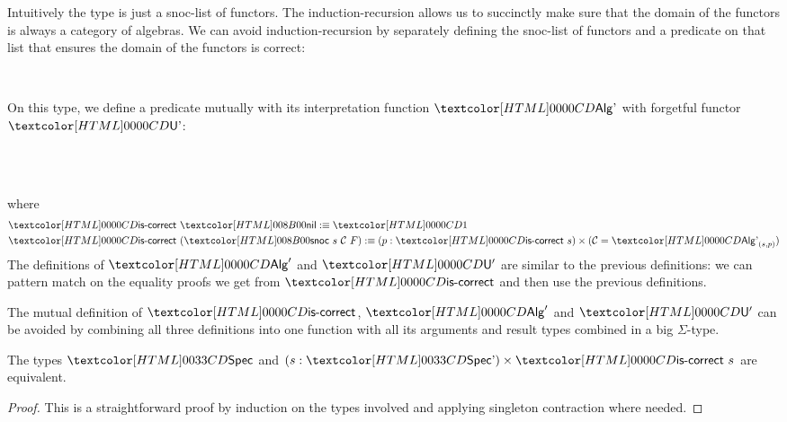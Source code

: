 Intuitively the type is just a snoc-list of functors. The
induction-recursion allows us to succinctly make sure that the domain
of the functors is always a category of algebras. We can avoid
induction-recursion by separately defining the snoc-list of functors
and a predicate on that list that ensures the domain of the functors
is correct:

\begin{definition}
  \begin{datatype}{\specaltty}{\Set}
    \constr{\specaltnil}{\specaltty} \\
    \constr{\specaltsnoc}{\specaltty \to (\Cc : \Cat)\ (\Func{\Cc}{\SET}) \to \specaltty}
  \end{datatype}
  On this type, we define a predicate mutually with its interpretation
  function $\Algalt$ with forgetful functor $\Undalt$:
  \begin{sorts}
    \functy{\specaltiscorrect}{\specaltty \to \Set} \\
     \\
  \end{sorts}
  where
  \begin{align*}
    &\specaltiscorrect\ \specaltnil \ddefeq \unitty \\
    &\specaltiscorrect\ (\specaltsnoc\ s\ \Cc\ F) \ddefeq (p : \specaltiscorrect\ s) \times (\Cc = \Algalt_{(s,p)})
  \end{align*}
  The definitions of $\Alg'$ and $\Und'$ are similar to the previous
  definitions: we can pattern match on the equality proofs we get from
  $\specaltiscorrect$ and then use the previous definitions.
\end{definition}

\begin{remark}
  The mutual definition of $\specaltiscorrect$, $\Alg'$ and $\Und'$
  can be avoided by combining all three definitions into one function
  with all its arguments and result types combined in a big
  $\Sigma$-type.
\end{remark}

\begin{proposition}
  The types $\specty$ and $(s : \specaltty) \times \specaltiscorrect\ s$ are equivalent.
\end{proposition}

\begin{proof}
  This is a straightforward proof by induction on the types involved
  and applying singleton contraction where needed.
\end{proof}

